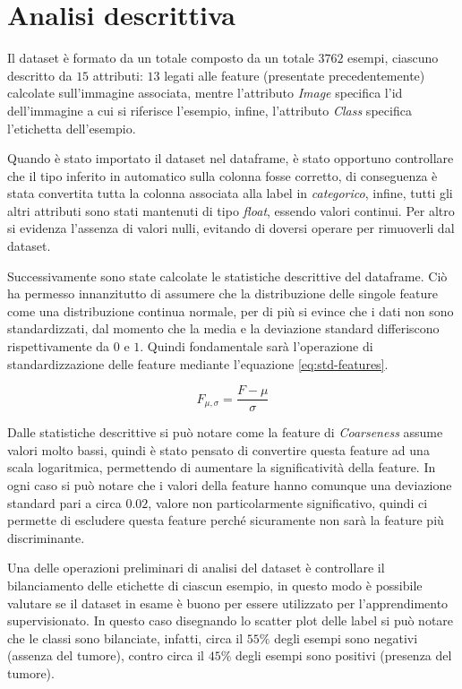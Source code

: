 \section{Analisi descrittiva}
Il dataset è formato da un totale composto da un totale $3762$ esempi, ciascuno
descritto da $15$ attributi: $13$ legati alle feature (presentate precedentemente) 
calcolate sull'immagine associata, mentre l'attributo \textit{Image} specifica l'id
dell'immagine a cui si riferisce l'esempio, infine, l'attributo \textit{Class}
specifica l'etichetta dell'esempio.

Quando è stato importato il dataset nel dataframe, è stato opportuno controllare che il tipo
inferito in automatico sulla colonna fosse corretto, di conseguenza è stata convertita
tutta la colonna associata alla label in \textit{categorico}, infine, tutti gli altri attributi sono
stati mantenuti di tipo \textit{float}, essendo valori continui. Per altro si evidenza
l'assenza di valori nulli, evitando di doversi operare per rimuoverli dal dataset.

Successivamente sono state calcolate le statistiche descrittive del dataframe. Ciò
ha permesso innanzitutto di assumere che la distribuzione delle singole feature
come una distribuzione continua normale, per di più si evince che i dati non sono
standardizzati, dal momento che la media e la deviazione standard differiscono rispettivamente
da $0$ e $1$. Quindi fondamentale sarà l'operazione di standardizzazione delle feature
mediante l'equazione \ref{eq:std-features}.

\begin{equation}
    F_{\mu, \sigma} = \frac{F - \mu}{\sigma}
    \label{eq:std-features}
\end{equation}

Dalle statistiche descrittive si può notare come la feature di \textit{Coarseness}
assume valori molto bassi, quindi è stato pensato di convertire questa feature ad una
scala logaritmica, permettendo di aumentare la significatività della feature. In 
ogni caso si può notare che i valori della feature hanno comunque una deviazione standard
pari a circa $0.02$, valore non particolarmente significativo, quindi ci permette
di escludere questa feature perché sicuramente non sarà la feature più discriminante.

Una delle operazioni preliminari di analisi del dataset è controllare il bilanciamento
delle etichette di ciascun esempio, in questo modo è possibile valutare se il
dataset in esame è buono per essere utilizzato per l'apprendimento supervisionato.
In questo caso disegnando lo scatter plot delle label si può notare che le classi
sono bilanciate, infatti, circa il $55\%$ degli esempi sono negativi (assenza del tumore),
contro circa il $45\%$ degli esempi sono positivi (presenza del tumore).


